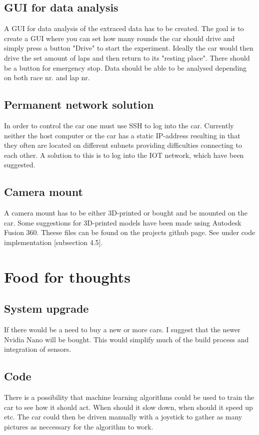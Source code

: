 \documentclass{article}
\begin{document}
	\subsection{GUI for data analysis}
		A GUI for data analysis of the extraced data has to be created. The goal is to create a GUI where you can set how many rounds the car should drive and simply press a button "Drive" to start the experiment. Ideally the car would then drive the set amount of laps and then return to its "resting place". There should be a button for emergency stop. Data should be able to be analysed depending on both race nr. and lap nr.

	\subsection{Permanent network solution}
		In order to control the car one must use SSH to log into the car. Currently neither the host computer or the car has a static IP-address resulting in that they often are located on different subnets providing difficulties connecting to each other. A solution to this is to log into the IOT network, which have been suggested.

	\subsection{Camera mount}
		A camera mount has to be either 3D-printed or bought and be mounted on the car. Some suggestions for 3D-printed models have been made using Autodesk Fusion 360. Theese files can be found on the projects github page. See under code implementation [subsection 4.5].







\section{Food for thoughts}
	\subsection{System upgrade}
		If there would be a need to buy a new or more cars. I suggest that the newer Nvidia Nano will be bought. This would simplify much of the build process and integration of sensors.
	
	\subsection{Code}
		There is a possibility that machine learning algorithms could be used to train the car to see how it should act. When should it slow down, when should it speed up etc. The car could then be driven manually with a joystick to gather as many pictures as neccessary for the algorithm to work.
\end{document}
